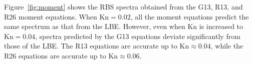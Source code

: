 
Figure~\ref{fig:moment} shows the RBS spectra obtained from the G13, R13, and R26 moment equations. When $\text{Kn}=0.02$, all the moment equations predict the same spectrum as that from the LBE. However, even when $\text{Kn}$ is increased to $\text{Kn}=0.04$, spectra predicted by the G13 equations deviate significantly from those of the LBE. The R13 equations are accurate up to $\text{Kn}\approx0.04$, while the R26 equations are accurate up to $\text{Kn}\approx0.06$. 









